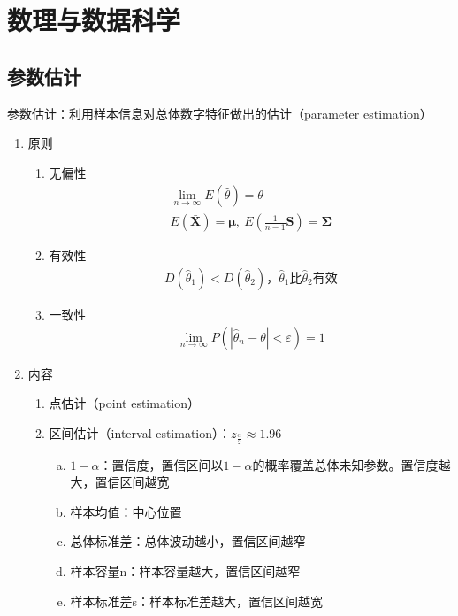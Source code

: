 \documentclass[12pt]{book}
\begin{document}
\part{数理与数据科学}





\chapter{参数估计}

参数估计：利用样本信息对总体数字特征做出的估计（parameter estimation）
\\

\begin{enumerate}[1.]
    \item 原则
          \begin{enumerate}[(1)]
              \item 无偏性
                    \begin{gather*}
                        \lim_{n→\infty}{E(\hat{\theta})=\theta } \\
                        E\left(\bar{\bm{X}}\right)=\bm{\mu},\ E\left(\frac{1}{n-1}\bm{S}\right)=\bm{\Sigma}
                    \end{gather*}
              \item 有效性
                    \begin{gather*}
                        D(\hat{\theta}_1)<D(\hat{\theta}_2)，\hat{\theta}_1比\hat{\theta}_2有效
                    \end{gather*}
              \item 一致性
                    \begin{gather*}
                        \lim_{n\rightarrow\infty}{P\left({\left|{\hat{\theta}}_n-\theta\right|<\varepsilon}\right)}=1
                    \end{gather*}
          \end{enumerate}
    \item 内容
          \begin{enumerate}[(1)]
              \item 点估计（point estimation）
              \item 区间估计（interval estimation）：$z_{\frac{\alpha}{2}}\approx 1.96$
                    \begin{enumerate}[a.]
                        \item $1-\alpha$：置信度，置信区间以$1-\alpha$的概率覆盖总体未知参数。置信度越大，置信区间越宽
                        \item 样本均值：中心位置
                        \item 总体标准差：总体波动越小，置信区间越窄
                        \item 样本容量n：样本容量越大，置信区间越窄
                        \item 样本标准差s：样本标准差越大，置信区间越宽
                    \end{enumerate}
          \end{enumerate}
\end{enumerate}
\end{document}
